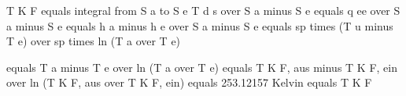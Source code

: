 T K F equals integral from S a to S e T d s over S a minus S e equals q ee over S a minus S e equals h a minus h e over S a minus S e equals sp times (T u minus T e) over sp times ln (T a over T e)  

equals T a minus T e over ln (T a over T e) equals T K F, aus minus T K F, ein over ln (T K F, aus over T K F, ein) equals 253.12157 Kelvin equals T K F